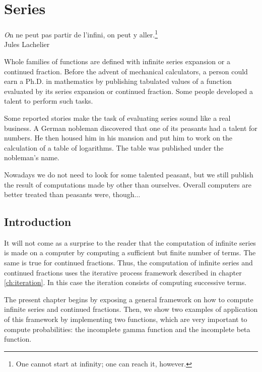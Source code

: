 
%
%

\chapter{Series}
\label{ch:series}
\begin{flushright}
{\textsl On ne peut pas partir de l'infini, on peut y
aller.}\footnote{One cannot start at infinity; one can reach it,
however.}\\ Jules Lachelier
\end{flushright}
\vspace{1 ex} Whole families of functions are defined with
infinite series expansion or a continued fraction. Before the
advent of mechanical calculators, a person could earn a Ph.D. in
mathematics by publishing tabulated values of a function evaluated
by its series expansion or continued fraction. Some people
developed a talent to perform such tasks.

Some reported stories make the task of evaluating series sound
like a real business. A German nobleman discovered that one of its
peasants had a talent for numbers. He then housed him in his
mansion and put him to work on the calculation of a table of
logarithms. The table was published under the nobleman's
name\cite{Ifrah}.

Nowadays we do not need to look for some talented peasant, but we
still publish the result of computations made by other than
ourselves. Overall computers are better treated than peasants
were, though$\ldots$

\section{Introduction}
It will not come as a surprise to the reader that the computation
of infinite series is made on a computer by computing a sufficient
but finite number of terms. The same is true for continued
fractions. Thus, the computation of infinite series and continued
fractions uses the iterative process framework described in
chapter \ref{ch:iteration}. In this case the iteration consists of
computing successive terms.

The present chapter begins by exposing a general framework on how
to compute infinite series and continued fractions. Then, we show
two examples of application of this framework by implementing two
functions, which are very important to compute probabilities: the
incomplete gamma function and the incomplete beta function.

